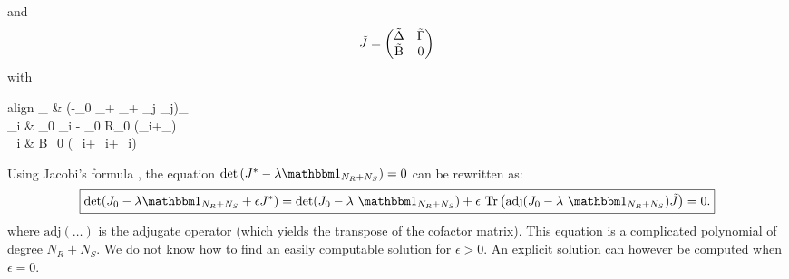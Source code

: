 \documentclass[12pt, titlepage]{report}
\begin{document}
	 and
	 \begin{equation}
	 \tilde{J} = \begin{pmatrix}
	 \tilde{\Delta} & \tilde{\Gamma} \\
	 \tilde{\text{B}} & 0
	 \end{pmatrix}
	 \end{equation}
	 with
	 \begin{empheq}{align}
	 \tilde{\Delta}_{\mu \nu} &  \left(-\Delta_0 _\mu + _\mu+  \sum_j \tilde{\alpha}_{\mu j}\right)\delta_{\mu \nu} \\
	 \tilde{\Gamma}_{\mu i} &  \alpha_0 \tilde{\alpha}_{\mu i} - \gamma_0 R_0 \left(\tilde{\gamma}_{i\mu}+_\mu\right) \\
	 _{i \mu} &  B_0 \left(\tilde{\sigma}_{i\mu}+\tilde{\gamma}_{i\mu}+_i\right)
	 \end{empheq}
	Using Jacobi's formula \cite{magnus_matrix_2019}, the equation $\det\left(J^*-\lambda \identity{N_R+N_S}\right)=0$ can be rewritten as:
	\begin{equation}
	\boxed{
	\det(J_0-\lambda \identity{N_R+N_S} + \epsilon J^*)=\det(J_0-\lambda \identity{N_R+N_S})+\epsilon \ \trace{\text{adj}(J_0-\lambda \identity{N_R+N_S})\tilde{J}}=0.
	}\label{eq : determinant variance first order}
	\end{equation}
	where $\text{adj}\left(\dots\right)$ is the adjugate operator (\ie which yields the transpose of the cofactor matrix). This equation is a complicated polynomial of degree $N_R+N_S$. We do not know how to find an easily computable solution for $\epsilon > 0$. An explicit solution can however be computed when $\epsilon = 0$.
\end{document}
